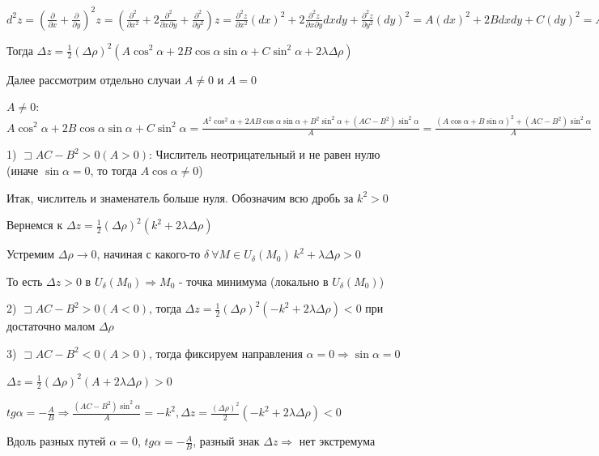 \documentclass[12pt]{article}
\begin{document}
    $d^2 z = (\frac{\partial}{\partial x} + \frac{\partial}{\partial y})^2 z = (\frac{\partial^2}{\partial x^2} + 2 \frac{\partial^2}{\partial x \partial y} + \frac{\partial^2}{\partial y^2}) z =
    \frac{\partial^2 z}{\partial x^2} (dx)^2 + 2 \frac{\partial^2 z}{\partial x \partial y} dxdy + \frac{\partial^2 z}{\partial y^2} (dy)^2 = A (dx)^2 + 2B dxdy + C(dy)^2 =
    A(\Delta \rho)^2 \cos^2\alpha + 2B (\Delta \rho)^2 \cos\alpha\sin\alpha + C(\Delta \rho)^2 \sin^2\alpha$

    Тогда $\Delta z = \frac{1}{2} (\Delta \rho)^2 (A\cos^2\alpha + 2B\cos\alpha\sin\alpha + C\sin^2\alpha + 2\lambda \Delta \rho)$

    Далее рассмотрим отдельно случаи $A \neq 0$ и $A = 0$

    $A \neq 0$: $A\cos^2\alpha + 2B\cos\alpha\sin\alpha + C\sin^2\alpha = \frac{A^2\cos^2\alpha + 2AB\cos\alpha\sin\alpha + B^2\sin^2\alpha + (AC - B^2)\sin^2\alpha}{A} =
    \frac{(A\cos\alpha + B\sin\alpha)^2 + (AC - B^2)\sin^2\alpha}{A}$

    1) $\sqsupset AC - B^2 > 0 (A > 0)$: Числитель неотрицательный и не равен нулю (иначе $\sin\alpha = 0$, то тогда $A\cos\alpha \neq 0$)

    Итак, числитель и знаменатель больше нуля. Обозначим всю дробь за $k^2 > 0$

    Вернемся к $\Delta z = \frac{1}{2}(\Delta \rho)^2 (k^2 + 2\lambda\Delta\rho)$

    Устремим $\Delta \rho \rightarrow 0$, начиная с какого-то $\delta \ \forall M \in U_\delta(M_0) \ k^2 + \lambda\Delta\rho > 0$

    То есть $\Delta z > 0$ в $U_\delta(M_0) \Longrightarrow M_0$ - точка минимума (локально в $U_\delta(M_0)$)

    2) $\sqsupset AC - B^2 > 0 (A < 0)$, тогда $\Delta z = \frac{1}{2}(\Delta \rho)^2 (-k^2 + 2\lambda\Delta\rho) < 0$ при достаточно малом $\Delta \rho$

    3) $\sqsupset AC - B^2 < 0 (A > 0)$, тогда фиксируем направления $\alpha = 0 \Longrightarrow \sin\alpha = 0$

    $\Delta z = \frac{1}{2}(\Delta \rho)^2 (A + 2\lambda\Delta\rho) > 0$

    $tg \alpha = -\frac{A}{B} \Longrightarrow \frac{(AC - B^2)\sin^2\alpha}{A} = -k^2, \Delta z = \frac{(\Delta \rho)^2}{2}(-k^2 + 2\lambda\Delta\rho) < 0$

    Вдоль разных путей $\alpha = 0$, $tg \alpha = -\frac{A}{B}$, разный знак $\Delta z \Longrightarrow$ нет экстремума
\end{document}
